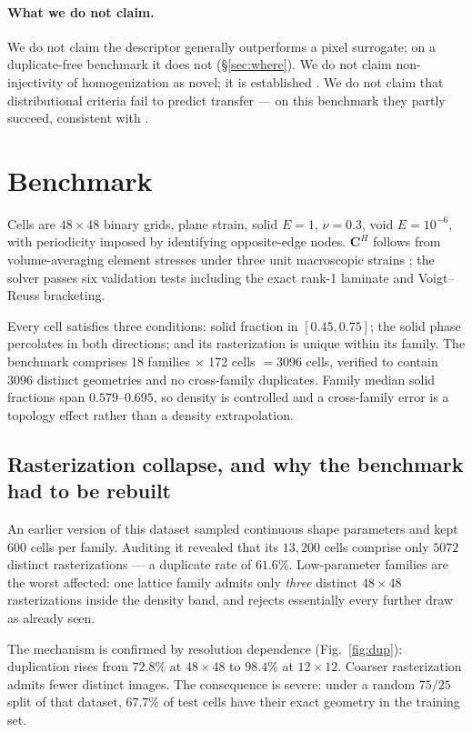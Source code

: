 \documentclass[11pt,a4paper]{article}
\newcommand{\CH}{\mathbf{C}^{H}}
\begin{document}
\paragraph{What we do not claim.} We do not claim the descriptor generally outperforms a
pixel surrogate; on a duplicate-free benchmark it does not (\S\ref{sec:where}). We do not
claim non-injectivity of homogenization as novel; it is established \citep{kumar2021}.
We do not claim that distributional criteria fail to predict transfer --- on this benchmark
they partly succeed, consistent with \citep{liu2026}.

\section{Benchmark}
\label{sec:bench}

Cells are $48\times48$ binary grids, plane strain, solid $E=1$, $\nu=0.3$, void
$E=10^{-6}$, with periodicity imposed by identifying opposite-edge nodes. $\CH$ follows
from volume-averaging element stresses under three unit macroscopic strains
\citep{andreassen2014}; the solver passes six validation tests including the exact rank-1
laminate and Voigt--Reuss bracketing.

Every cell satisfies three conditions: solid fraction in $[0.45,0.75]$; the solid phase
percolates in both directions; and its rasterization is unique within its family. The
benchmark comprises 18 families $\times$ 172 cells $=3096$ cells, verified to contain
$3096$ distinct geometries and no cross-family duplicates. Family median solid fractions
span $0.579$--$0.695$, so density is controlled and a cross-family error is a topology
effect rather than a density extrapolation.

\subsection{Rasterization collapse, and why the benchmark had to be rebuilt}
\label{sec:dup}

An earlier version of this dataset sampled continuous shape parameters and kept 600 cells
per family. Auditing it revealed that its $13{,}200$ cells comprise only $5072$ distinct
rasterizations --- a duplicate rate of $61.6\%$. Low-parameter families are the worst
affected: one lattice family admits only \emph{three} distinct $48\times48$ rasterizations
inside the density band, and rejects essentially every further draw as already seen.

The mechanism is confirmed by resolution dependence (Fig.~\ref{fig:dup}): duplication rises
from $72.8\%$ at $48\times48$ to $98.4\%$ at $12\times12$. Coarser rasterization admits
fewer distinct images. The consequence is severe: under a random $75/25$ split of that
dataset, $67.7\%$ of test cells have their exact geometry in the training set.
\end{document}
